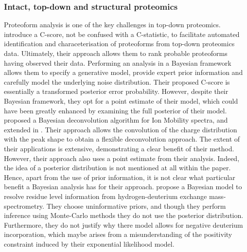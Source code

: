 \documentclass[12pt,english]{article}
\begin{document}
\subsubsection{Intact, top-down and structural proteomics}
Proteoform analysis is one of the key challenges in top-down proteomics. \citet{Leduc::2014} introduce a C-score, not be confused with a C-statistic, to facilitate automated identification and characeterisation of proteoforms from top-down proteomics data. Ultimately, their approach allows them to rank probable proteoforms having observed their data. Performing an analysis in a Bayesian framework allows them to specify a generative model, provide expert prior information and carefully model the underlying noise distribution. Their proposed C-score is essentially a transformed posterior error probability. However, despite their Bayesian framework, they opt for a point estimate of their model, which could have been greatly enhanced by examining the full posterior of their model. \citet{Marty::2015} proposed a Bayesian deconvolution algorithm for Ion Mobility spectra, and extended in \citet{Kostelic::2021}. Their approach allows the convolution of the charge distribution with the peak shape to obtain a flexible deconvolution approach. The extent of their applications is extensive, demonstrating a clear benefit of their method. However, their approach also uses a point estimate from their analysis. Indeed, the idea of a posterior distribution is not mentioned at all within the paper. Hence, apart from the use of prior information, it is not clear what particular benefit a Bayesian analysis has for their approach. \citet{Saltzberg::2017} propose a Bayesian model to resolve residue level information from hydrogen-deuterium exchange mass-spectrometry. They choose uninformative priors, and though they perform inference using Monte-Carlo methods they do not use the posterior distribution. Furthermore, they do not justify why there model allows for negative deuterium incorporation, which maybe arises from a misunderstanding of the positivity constraint induced by their exponential likelihood model.  
\end{document}
